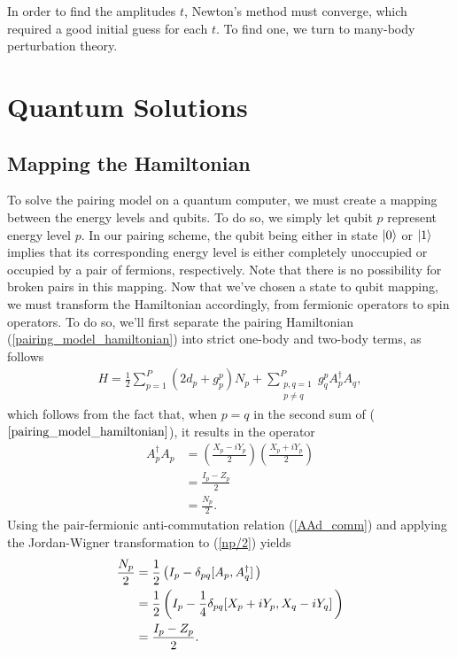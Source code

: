 \documentclass[Dual]{msu-thesis}
\begin{document}
In order to find the amplitudes $t$, Newton's method must converge, which required a good initial guess for each $t$. To find one, we turn to many-body perturbation theory.

\section{Quantum Solutions}

\subsection{Mapping the Hamiltonian}

To solve the pairing model on a quantum computer, we must create a mapping between the energy levels and qubits. To do so, we simply let qubit $p$ represent energy level $p$. In our pairing scheme, the qubit being either in state $\ket{0}$ or $\ket{1}$ implies that its corresponding energy level is either completely unoccupied or occupied by a pair of fermions, respectively. Note that there is no possibility for broken pairs in this mapping. Now that we've chosen a state to qubit mapping, we must transform the Hamiltonian accordingly, from fermionic operators to spin operators. To do so, we'll first separate the pairing Hamiltonian (\ref{pairing_model_hamiltonian})
into strict one-body and two-body terms, as follows
\begin{align}
\label{pairing_model_hamiltonian_strict}
H
=
\frac{1}{2}\sum_{p=1}^P(2d_p+g^p_p)N_p
+\sum_{\substack{p,q=1 \\ p\neq q}}^Pg^p_qA^\dagger_pA_q
,\end{align}
which follows from the fact that, when $p=q$ in the second sum of ($\ref{pairing_model_hamiltonian}$), it results in the operator
\begin{align}
A^\dagger_pA_p
&=
\left(\frac{X_p-iY_p}{2}\right)\left(\frac{X_p+iY_p}{2}\right)
\\
&=
\frac{I_p-Z_p}{2}
\\
\label{np/2}
&=
\frac{N_p}{2}.
\end{align}
Using the pair-fermionic anti-commutation relation (\ref{AAd_comm}) and applying the Jordan-Wigner transformation to (\ref{np/2}) yields
\begin{align}
\frac{N_p}{2}
&=
\frac{1}{2}
\left(I_p-\delta_{pq}\comm*{A_p}{A^\dagger_q}\right)
\\
&=
\frac{1}{2}
\left(I_p-\frac{1}{4}\delta_{pq}\comm*{X_p+iY_p}{X_q-iY_q}\right)
\\
&=
\frac{I_p-Z_p}{2}.
\end{align}
\end{document}
